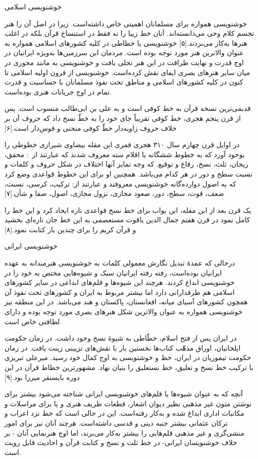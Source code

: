 \documentclass[a4paper]{article}
\begin{document}
\begin{flushright}
خوشنویسی اسلامی

خوشنویسی همواره برای مسلمانان اهمیتی خاص داشته‌است. زیرا در اصل آن را هنر تجسم کلام وحی می‌دانسته‌اند. آنان خط زیبا را نه فقط در استنساخ قرآن بلکه در اغلب هنرها به‌کار می‌بردند.[۵] خوشنویسی یا خطاطی در کلیه کشورهای اسلامی همواره به عنوان والاترین هنر مورد توجه بوده است. مردمان این سرزمین‌ها به‌ویژه ایرانیان در اوج قدرت و نهایت ظرافت در این هنر تجلی یافت و خوشنویسی به مانند محوری در میان سایر هنرهای بصری ایفای نقش کرده‌است. خوشنویسی از قرون اولیه اسلامی تا کنون در کلیه کشورهای اسلامی و مناطق تحت نفوذ مسلمانان با حساسیت و قدرت تمام در اوج جریانات هنری بوده‌است.

قدیمی‌ترین نسخه قرآن به خط کوفی است و به علی بن ابی‌طالب منسوب است. پس از قرن پنجم هجری، خط کوفی تقریباً جای خود را به خطّ نسخ داد که حروف آن بر خلاف حروف زاویه‌دار خطّ کوفی منحنی و قوس‌دار است.[۶]

در اوایل قرن چهارم سال ۳۱۰ هجری قمری ابن مقله بیضاوی شیرازی خطوطی را بوجود آورد که به خطوط ششگانه یا اقلام سته معروف شدند که عبارتند از : محقق، ریحان، ثلث، نسخ، رقاع و توقیع. که وجه تمایز آنها اختلاف در شکل حروف و کلمات و نسبت سطح و دور در هر کدام می‌باشد. همچنین او برای این خطوط قواعدی وضع کرد که یه اصول دوارده‌گانه خوشنویسی معروفند و عبارتند از: ترکیب، کرسی، نسبت، ضعف، قوت، سطح، دور، صعود مجازی، نزول مجازی، اصول، صفا و شأن.[۷]

یک قرن بعد از ابن مقله، ابن بواب برای خط نسخ قواعدی تازه ایجاد کرد و این خط را کامل نمود در قرن هفتم جمال الدین یاقوت مستعصمی به این خط جان تازه‌ای بخشید و قرآن کریم را برای چندین بار کتابت نمود.[۸]



خوشنویسی ایرانی

درحالی که عمدهٔ تبدیل نگارش معمولی کلمات به خوشنویسی هنرمندانه به عهده ایرانیان بوده‌است، رفته رفته ایرانیان سبک و شیوه‌هایی مختص به خود را در خوشنویسی ابداع کردند. هرچند این شیوه‌ها و قلم‌های ابداعی در سایر کشورهای اسلامی هم طرفدارانی دارد اما بیشتر مربوط به ایران و کشورهای تحت نفوذ آن همچون کشورهای آسیای میانه، افغانستان، پاکستان و هند می‌باشد. در این منطقه نیز خوشنویسی همواره به عنوان والاترین شکل هنرهای بصری مورد توجه بوده و دارای لطافتی خاص است.

در ایران پس از فتح اسلام، خطّاطی به شیوهٔ نسخ وجود داشت. در زمان حکومت ایلخانیان، اوراق مذهّب کتاب‌ها نخستین بار با نقش‌های تزیینی زینت یافت. در زمان حکومت تیموریان در ایران، خط و خوشنویسی به اوج کمال خود رسید. میرعلی تبریزی با ترکیب خط نسخ و تعلیق، خط نستعلیق را بنیان نهاد. مشهورترین خطاط قرآن در این دوره بایسنقر میرزا بود.[۹]

آنچه که به عنوان شیوه‌ها یا قلم‌های خوشنویسی ایرانی شناخته می‌شود بیشتر برای نوشتن متون غیر مذهبی نظیر دیوان اشعار، قطعات ظریف هنری و یا برای مراسلات و مکاتبات اداری ابداع شده و به‌کار رفته‌است. این در حالی است که خط نزد اعراب و ترکان عثمانی بیشتر جنبه دینی و قدسی داشته‌است. هرچند آنان نیز برای امور منشی‌گری و غیر مذهبی قلم‌هایی را بیشتر به‌کار می‌برند، اما اوج هنرنمایی آنان - بر خلاف خوشنویسان ایرانی- در خط ثلت و نسخ و کتابت قرآن و احادیث قابل رویت است.


\end{flushright}
\end{document}
